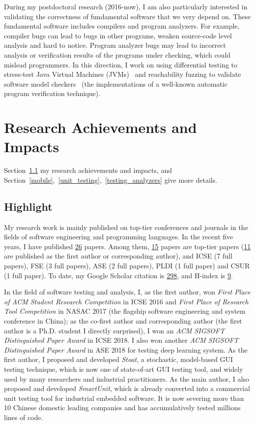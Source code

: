 \documentclass[a4paper]{article}
\begin{document}
During my postdoctoral research (2016-now), I am also particularly interested in validating the correctness of fundamental software that we very depend on. These fundamental software includes compilers and program analyzers. For example, compiler bugs can lead to bugs in other programs, weaken source-code level analysis and hard to notice. Program analyzer bugs may lead to incorrect analysis or verification results of the programs under checking, which could mislead programmers. In this direction, I work on using differential testing to stress-test Java Virtual Machines (JVMs)~\cite{classfuzz,classming} and reachability fuzzing to validate software model checkers~\cite{mcfuzz} (the implementations of a well-known automatic program verification technique). 


\section{Research Achievements and Impacts}

Section~\ref{highlight} my research achievements and impacts, and Section~\ref{mobile},~\ref{unit_testing},~\ref{testing_analyzers} give more details.

\subsection{Highlight}
\label{highlight}

My research work is mainly published on top-tier conferences and journals in the fields of software engineering and programming languages. In the recent five years, I have published \underline{26} papers. Among them, \underline{15} papers are top-tier papers (\underline{11} are published as the first author or corresponding author), and ICSE (7 full papers), FSE (3 full papers), ASE (2 full papers), PLDI (1 full paper) and CSUR (1 full paper). To date, my Google Scholar citation is \underline{298}, and H-index is \underline{9}.

In the field of software testing and analysis, I, as the first author, won \emph{First Place of ACM Student Research Competition} in ICSE 2016 and \emph{First Place of Research Tool Competition} in NASAC 2017 (the flagship software engineering and system conference in China); as the co-first author and corresponding author (the first author is a Ph.D. student I directly surprised), I won an \emph{ACM SIGSOFT Distinguished Paper Award} in ICSE 2018. I also won another \emph{ACM SIGSOFT Distinguished Paper Award} in ASE 2018 for testing deep learning system. As the first author, I proposed and developed \emph{Stoat}, a stochastic, model-based GUI testing technique, which is now one of state-of-art GUI testing tool, and widely used by many researchers and industrial practitioners.
As the main author, I also proposed and developed \emph{SmartUnit}, which is already converted into a commercial unit testing tool for industrial embedded software. It is now severing more than 10 Chinese domestic leading companies and has accumulatively tested millions lines of code.
\end{document}
